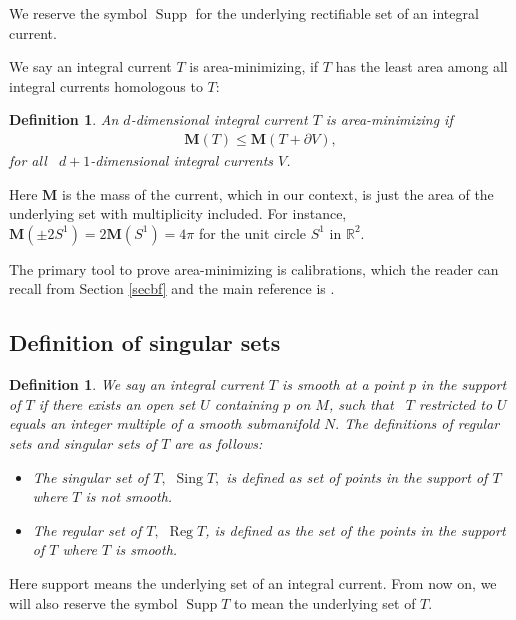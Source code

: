 \documentclass[11pt,a4paper]{amsart}
\numberwithin{equation}{section}
\newcommand{\supp}{\operatorname{Supp}}
\newcommand{\sing}{{\operatorname{Sing}}}
\newcommand{\ms}{\mathbf{M}}
\newcommand{\pd}{\partial}
\newcommand{\R}{\mathbb{R}}
\theoremstyle{plain}
\newtheorem{defn}[exam]{Definition}
\theoremstyle{definition}
\numberwithin{equation}{subsection}
\begin{document}
	We reserve the symbol $\supp$ for the underlying rectifiable set of an integral current.
	
	We say an integral current $T$ is area-minimizing, if $T$ has the least area among all integral currents homologous to $T$:
	\begin{defn}\label{defnam}
		An $d$-dimensional integral current $T$ is area-minimizing if 
		\begin{align*}
			\ms(T)\le \ms(T+\pd V),
		\end{align*}for all  $d+1$-dimensional integral currents $V$. 
	\end{defn}
	Here $\ms$ is the mass of the current, which in our context, is just the area of the underlying set with multiplicity included. For instance, $\ms(\pm 2 S^1)=2\ms(S^1)=4\pi$ for the unit circle $S^1$ in $\R^2.$
	
	The primary tool to prove area-minimizing is calibrations, which the reader can recall from Section \ref{secbf} and the main reference is \cite{HL}.
	
	\subsection{Definition of singular sets}
	\begin{defn}\label{defnsm}
		We say an integral current $T$ is smooth at a point $p$ in the support of $T$ if there exists an open set $U$ containing $p$ on $M$, such that  $T$ restricted to $U$ equals an integer multiple of a smooth submanifold $N.$ The definitions of regular sets and singular sets of $T$ are as follows:
		\begin{itemize}
			\item The singular set of $T,$ $\sing T,$ is defined as set of points in the support of $T$ where $T$ is not smooth.		
			\item 
			The regular set of $T,$ $\operatorname{Reg}T$, is defined as the set of the points in the support of $T$ where $T$ is smooth. 
		\end{itemize}
	\end{defn} 
	Here support means the underlying set of an integral current. From now on, we will also reserve the symbol $\supp T$ to mean the underlying set of $T.$ %
	
\end{document}
